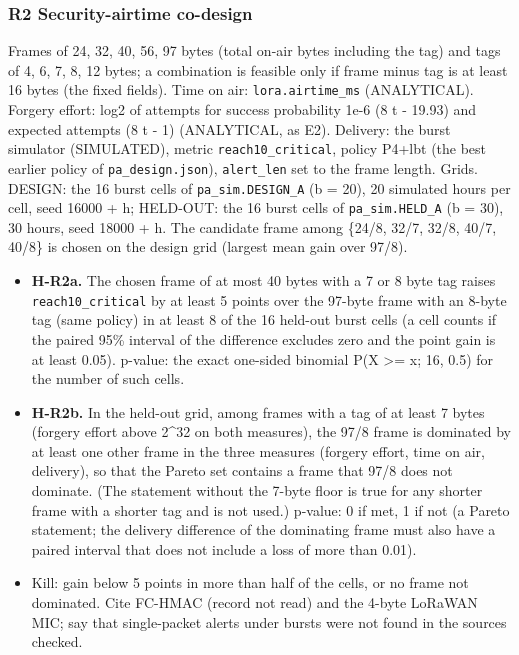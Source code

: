 \subsubsection*{R2 Security-airtime co-design}
Frames of 24, 32, 40, 56, 97 bytes (total on-air bytes including the tag) and tags of 4, 6, 7, 8, 12 bytes; a combination is feasible only if frame minus tag is at least 16 bytes (the fixed fields). Time on air: \texttt{lora.airtime\_ms} (ANALYTICAL). Forgery effort: log2 of attempts for success probability 1e-6 (8 t - 19.93) and expected attempts (8 t - 1) (ANALYTICAL, as E2). Delivery: the burst simulator (SIMULATED), metric \texttt{reach10\_critical}, policy P4+lbt (the best earlier policy of \texttt{pa\_design.json}), \texttt{alert\_len} set to the frame length.
Grids. DESIGN: the 16 burst cells of \texttt{pa\_sim.DESIGN\_A} (b = 20), 20 simulated hours per cell, seed 16000 + h; HELD-OUT: the 16 burst cells of \texttt{pa\_sim.HELD\_A} (b = 30), 30 hours, seed 18000 + h. The candidate frame among \{24/8, 32/7, 32/8, 40/7, 40/8\} is chosen on the design grid (largest mean gain over 97/8).
\begin{itemize}
\item \textbf{H-R2a.} The chosen frame of at most 40 bytes with a 7 or 8 byte tag raises \texttt{reach10\_critical} by at least 5 points over the 97-byte frame with an 8-byte tag (same policy) in at least 8 of the 16 held-out burst cells (a cell counts if the paired 95\% interval of the difference excludes zero and the point gain is at least 0.05). p-value: the exact one-sided binomial P(X >= x; 16, 0.5) for the number of such cells.
\item \textbf{H-R2b.} In the held-out grid, among frames with a tag of at least 7 bytes (forgery effort above 2\textasciicircum{}32 on both measures), the 97/8 frame is dominated by at least one other frame in the three measures (forgery effort, time on air, delivery), so that the Pareto set contains a frame that 97/8 does not dominate. (The statement without the 7-byte floor is true for any shorter frame with a shorter tag and is not used.) p-value: 0 if met, 1 if not (a Pareto statement; the delivery difference of the dominating frame must also have a paired interval that does not include a loss of more than 0.01).
\item Kill: gain below 5 points in more than half of the cells, or no frame not dominated. Cite FC-HMAC (record not read) and the 4-byte LoRaWAN MIC; say that single-packet alerts under bursts were not found in the sources checked.
\end{itemize}

